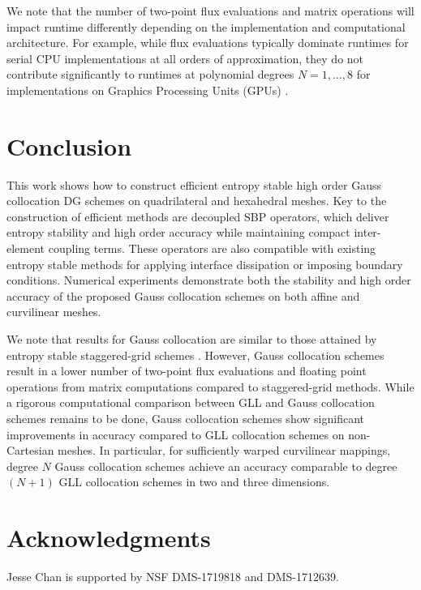 \documentclass[review,onefignum,onetabnum,final]{siamart171218}
\begin{document}
We note that the number of two-point flux evaluations and matrix operations will impact runtime differently depending on the implementation and computational architecture.  For example, while flux evaluations typically dominate runtimes for serial CPU implementations at all orders of approximation, they do not contribute significantly to runtimes at polynomial degrees $N=1,\ldots, 8$ for implementations on Graphics Processing Units (GPUs)  \cite{wintermeyer2018entropy}.  

\section{Conclusion}

This work shows how to construct efficient entropy stable high order Gauss collocation DG schemes on quadrilateral and hexahedral meshes.  Key to the construction of efficient methods are decoupled SBP operators, which deliver entropy stability and high order accuracy while maintaining compact inter-element coupling terms.  These operators are also compatible with existing entropy stable methods for applying interface dissipation \cite{winters2017uniquely} or imposing boundary conditions.  Numerical experiments demonstrate both the stability and high order accuracy of the proposed Gauss collocation schemes on both affine and curvilinear meshes.  

We note that results for Gauss collocation are similar to those attained by entropy stable staggered-grid schemes \cite{parsani2016entropy}.  However, Gauss collocation schemes result in a lower number of two-point flux evaluations and floating point operations from matrix computations compared to staggered-grid methods.  While a rigorous computational comparison between GLL and Gauss collocation schemes remains to be done, Gauss collocation schemes show significant improvements in accuracy compared to GLL collocation schemes on non-Cartesian meshes.  In particular, for sufficiently warped curvilinear mappings, degree $N$ Gauss collocation schemes achieve an accuracy comparable to degree $(N+1)$ GLL collocation schemes in two and three dimensions.  

\section{Acknowledgments}

Jesse Chan is supported by NSF DMS-1719818 and DMS-1712639.  

\appendix
\end{document}
